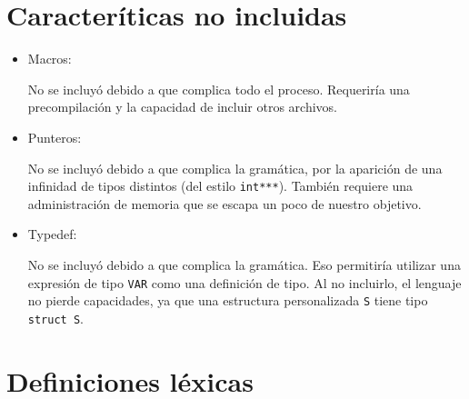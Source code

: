 \documentclass[12pt]{article}
\begin{document}
\section*{Caracter\'iticas no incluidas}
\begin{itemize}
    \item Macros:

    No se incluy\'o debido a que complica todo el proceso. Requerir\'ia una precompilaci\'on y la capacidad de incluir otros archivos.
    \item Punteros:

    No se incluy\'o debido a que complica la gram\'atica, por la aparici\'on de una infinidad de tipos distintos (del estilo \texttt{int***}). Tambi\'en requiere una administraci\'on de memoria que se escapa un poco de nuestro objetivo.

    \item Typedef:

    No se incluy\'o debido a que complica la gram\'atica. Eso permitir\'ia utilizar una expresi\'on de tipo \texttt{VAR} como una definici\'on de tipo. Al no incluirlo, el lenguaje no pierde capacidades, ya que una estructura personalizada \texttt{S} tiene tipo \texttt{struct S}.
\end{itemize}

\section*{Definiciones l\'exicas}
\end{document}
